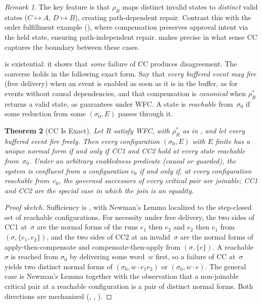 \documentclass[11pt,a4paper]{article}
\theoremstyle{plain}
\newtheorem{theorem}{Theorem}[section]
\theoremstyle{definition}
\theoremstyle{remark}
\newtheorem{remark}[theorem]{Remark}
\renewcommand{\_}{\textunderscore\allowbreak}
\begin{document}
\begin{remark}
The key feature is that $\rho_R$ maps distinct invalid states to
\emph{distinct} valid states ($C \mapsto A$, $D \mapsto B$), creating
path-dependent repair.  Contrast this with the order fulfillment example
(), where compensation preserves approval intent via the
held state, ensuring path-independent repair.   makes
precise in what sense CC captures the boundary between these cases.
\end{remark}

 is existential: it shows that \emph{some} failure of
CC produces disagreement.  The converse holds in the following exact form.
Say that \emph{every buffered event may fire} (free delivery) when an event is
enabled as soon as it is in the buffer, as for events without causal
dependencies, and that compensation is \emph{canonical} when $\rho_R^*$
returns a valid state, as  guarantees under WFC.  A state is
\emph{reachable} from~$\sigma_0$ if some reduction from some
$(\sigma_0, E)$ passes through it.

\begin{theorem}[CC Is Exact]
\label{thm:cc-exact}
Let $R$ satisfy WFC, with $\rho_R^*$ as in , and let every
buffered event fire freely.  Then every configuration $(\sigma_0, E)$ with $E$
finite has a unique normal form if and only if CC1 and CC2 hold at every
state reachable from~$\sigma_0$.  Under an arbitrary enabledness predicate
(causal or guarded), the system is confluent from a configuration $c_0$ if and
only if, at every configuration reachable from~$c_0$, the governed successors
of every critical pair are joinable; CC1 and CC2 are the special case in which
the join is an equality.
\end{theorem}

\begin{proof}[Proof sketch]
Sufficiency is , with Newman's Lemma localized to the
step-closed set of reachable configurations.  For necessity under free
delivery, the two sides of CC1 at~$\sigma$ are the normal forms of the runs
$e_1$ then $e_2$ and $e_2$ then $e_1$ from $(\sigma, \{e_1, e_2\})$, and the
two sides of CC2 at an invalid~$\sigma$ are the normal forms of
apply-then-compensate and compensate-then-apply from $(\sigma, \{e\})$.  A
reachable~$\sigma$ is reached from $\sigma_0$ by delivering some word~$w$
first, so a failure of CC at~$\sigma$ yields two distinct normal forms of
$(\sigma_0, w \cdot e_1 e_2)$ or $(\sigma_0, w \cdot e)$.  The general case is
Newman's Lemma together with the observation that a non-joinable critical pair
at a reachable configuration is a pair of distinct normal forms.  Both
directions are mechanized (, ,
).
\end{proof}
\end{document}
